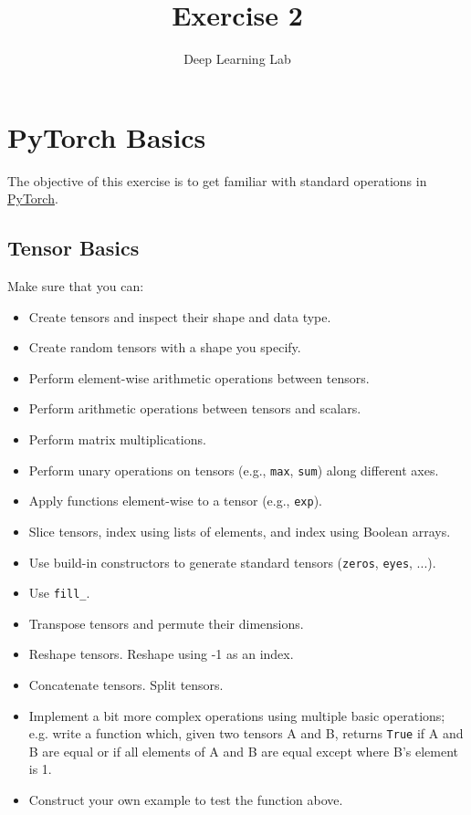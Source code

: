 \documentclass[a4paper,11pt]{article}
\title{Exercise 2}
\author{Deep Learning Lab}
\begin{document}
\maketitle

\section{PyTorch Basics}
The objective of this exercise is to get familiar with standard operations in \href{https://pytorch.org/tutorials/}{PyTorch}.
\subsection{Tensor Basics}
Make sure that you can:
 \begin{itemize}
  \item Create tensors and inspect their shape and data type.
\item Create random tensors with a shape you specify.
  \item Perform element-wise arithmetic operations between tensors.
  \item Perform arithmetic operations between tensors and scalars.
  \item Perform matrix multiplications.
  \item Perform unary operations on tensors (e.g., \texttt{max}, \texttt{sum}) along different axes.
  \item Apply functions element-wise to a tensor (e.g., \texttt{exp}).
  \item Slice tensors, index using lists of elements, and index using Boolean arrays.
\item Use build-in constructors to generate standard tensors (\texttt{zeros}, \texttt{eyes}, ...).
\item Use \texttt{fill\_}.
\item Transpose tensors and permute their dimensions.
  \item Reshape tensors. Reshape using -1 as an index.
\item Concatenate tensors. Split tensors.
\item Implement a bit more complex operations using multiple basic operations; e.g.
write a function which, given two tensors A and B, returns \texttt{True} if A and B are equal or if all elements of A and B are equal except where B's element is 1. 
\item Construct your own example to test the function above.
 \end{itemize}
\end{document}
